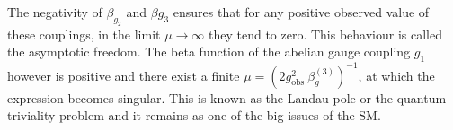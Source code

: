 \documentclass[11pt, a4paper]{article}
\newcommand{\jhkbf}[1]{\textbf{\color{red} [#1]}}
\newcommand{\jhkbf}[1]{\textbf{\color{red} [#1]}}
\begin{document}
The negativity of $\beta_{g_2}$ and $\beta{g_3}$ ensures that for any positive observed value of these couplings, in the limit $\mu \rightarrow \infty$ they tend to zero. This behaviour is called the asymptotic freedom.
The beta function of the abelian gauge coupling $g_1$ however is positive and
there exist a finite $\mu= \left(2 g_{\text{obs}}^2 \ \beta_{g}^{(3)} \right)^{-1} $, at which the expression becomes singular.
This is known as the Landau pole or the quantum triviality problem and
it remains as one of the big issues of the SM.
\end{document}
